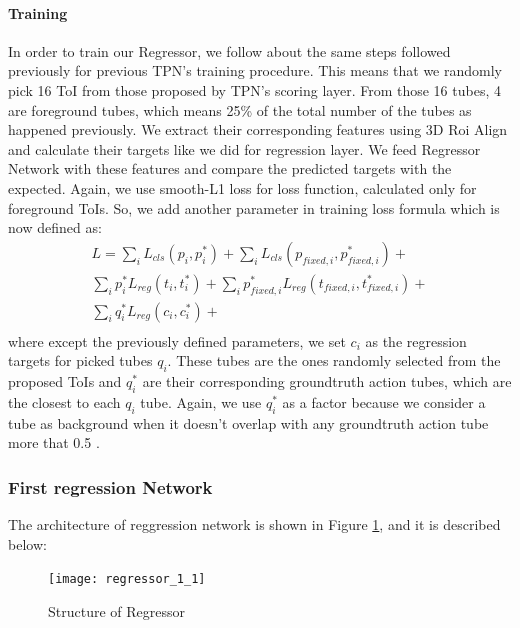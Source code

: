 \paragraph{ Training}
In order to train our Regressor, we follow about the same steps followed previously for previous TPN's training procedure. This means that
we randomly pick 16 ToI from those proposed by TPN's scoring layer. From those 16 tubes, 4 are foreground tubes, which means 25\% of the total
number of the tubes as happened previously. We extract their corresponding features using 3D Roi Align and calculate their targets like
we did for regression layer. We feed Regressor Network with these features and compare the predicted targets with the expected.
Again, we use smooth-L1 loss for loss function, calculated only for foreground ToIs. So, we add another parameter in
training loss formula which is now defined as:
\begin{equation} 
\begin{split}
 L  =  \sum_iL_{cls}(p_i, p_i^*) + \sum_iL_{cls}(p_{fixed,i}, p_{fixed,i}^*) + \\
 \sum_ip_i^*L_{reg}(t_i,t_i^*) + \sum_ip_{fixed,i}^*L_{reg}(t_{fixed,i},t_{fixed,i}^*) + \\
  \sum_iq_i^*L_{reg}(c_{i}, c_{i}^*) + \\
\end{split}
\end{equation}
where  except the previously defined parameters, we set  $c_{i} $ as the regression targets for picked tubes $q_i$.
These tubes are the ones randomly selected from the proposed ToIs and $q_i^*$ are their corresponding groundtruth action tubes, which are the closest to each $q_i$ tube.
Again, we use $q_i^*$ as a factor because we consider a tube as background when it doesn't overlap with any groundtruth action tube more that 0.5 .

\subsubsection{First regression Network} 

The architecture of reggression network is shown in Figure \ref{fig:regressor_3d}, and it is described below:
\begin{figure}[h]
  \centering
  \texttt{[image: regressor\_1\_1]}
  \caption{Structure of Regressor}
  \label{fig:regressor_3d}
\end{figure}

